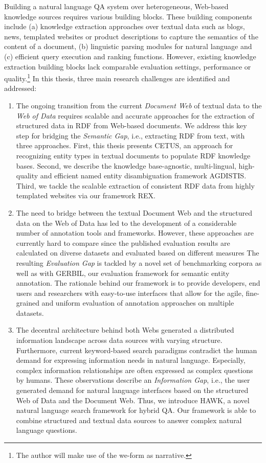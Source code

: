 Building a natural language \ac{QA} system over heterogeneous, Web-based knowledge sources requires various building blocks.
These building components include (a) knowledge extraction approaches over textual data such as blogs, news, templated websites or product descriptions to capture the semantics of the content of a document, (b) linguistic parsing modules for natural language and (c) efficient query execution and ranking functions.
However, existing knowledge extraction building  blocks lack comparable evaluation settings, performance or quality.{\let\thefootnote\relax\footnote{The author will make use of the we-form as narrative.}}
In this thesis, three main research challenges are identified and addressed:
\begin{enumerate}[topsep=0pt,itemsep=-1ex,partopsep=1ex,parsep=1ex]
\item 
The ongoing transition from the current \emph{Document Web} of textual data to the \emph{Web of Data} requires scalable and accurate approaches for the extraction of structured data in \ac{RDF} from Web-based documents.
We address this key step for bridging the \emph{Semantic Gap}, i.e., extracting RDF from text, with three approaches.
First, this thesis presents CETUS, an approach for recognizing entity types in textual documents to populate RDF knowledge bases. 
Second, we describe the knowledge base-agnostic, multi-lingual, high-quality and efficient named entity disambiguation framework AGDISTIS.
Third, we tackle the scalable extraction of consistent \ac{RDF} data from highly templated websites via our framework REX.
\item 
The need to bridge between the textual Document Web and the structured data on the Web of Data has led to the development of a considerable number of annotation tools and frameworks. 
However, these approaches are currently hard to compare since the published evaluation results are calculated on diverse datasets and evaluated based on different measures
The resulting \emph{Evaluation Gap} is tackled by a novel set of benchmarking corpora as well as with GERBIL, our evaluation framework for semantic entity annotation. 
The rationale behind our framework is to provide developers, end users and researchers with easy-to-use interfaces that allow for the agile, fine-grained and uniform evaluation of annotation approaches on multiple datasets.
\item 
The decentral architecture behind both Webs generated a distributed information landscape across data sources with varying structure. 
Furthermore, current keyword-based search paradigms contradict the human demand for expressing information needs in natural language.
Especially, complex information relationships are often expressed as complex questions by humans.
These observations describe an \emph{Information Gap}, i.e., the user generated demand for natural language interfaces based on the structured Web of Data and the Document Web.
Thus, we introduce HAWK, a novel natural language search framework for hybrid \ac{QA}. 
Our framework is able to combine structured and textual data sources to answer complex natural language questions.
\end{enumerate}
